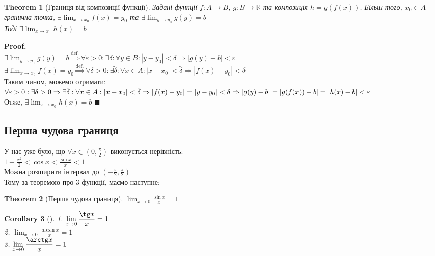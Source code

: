 \documentclass[a4paper, 14pt]{extarticle}
\def\huge{\displaystyle}
\theoremstyle{theoremdd}
\newtheorem{theorem}{Theorem}[subsection]
\theoremstyle{theoremdd}
\theoremstyle{theoremdd}
\theoremstyle{theoremdd}
\theoremstyle{theoremdd}
\theoremstyle{theoremdd}
\theoremstyle{theoremdd}
\theoremstyle{theoremdd}
\newtheorem{corollary}[theorem]{Corollary}
\newenvironment{pf}{\vspace*{-3mm} \textbf{Proof. \\}}{$\blacksquare$}
\begin{document}
\begin{theorem}[Границя від композиції функції]
Задані функції $f: A \to B$, $g: B \to \mathbb{R}$ та композиція $h = g(f(x))$. Більш того, $x_0 \in A$ - гранична точка, $\exists \huge \lim_{x \to x_0} f(x) = y_0$ та $\exists \huge \lim_{y \to y_0} g(y) = b$\\
Тоді $\exists \huge \lim_{x \to x_0} h(x) = b$
\end{theorem}

\begin{pf}
$\exists \huge \lim_{y \to y_0} g(y) = b \overset{\textrm{def.}}{\Rightarrow} \forall \varepsilon > 0: \exists \delta: \forall y \in B: |y-y_0|<\delta \Rightarrow |g(y)-b|<\varepsilon$\\
$\exists \huge \lim_{x \to x_0} f(x) = y_0 \overset{\textrm{def.}}{\Rightarrow} \forall \delta > 0: \exists \tilde{\delta}: \forall x \in A: |x-x_0|<\tilde{\delta} \Rightarrow |f(x)-y_0|<\delta$\\
Таким чином, можемо отримати:\\
$\forall \varepsilon > 0: \exists \delta > 0 \Rightarrow \exists \tilde{\delta}: \forall x \in A: |x-x_0| < \tilde{\delta} \Rightarrow \\ |f(x)-y_0| = |y-y_0|<\delta \Rightarrow |g(y)-b|=|g(f(x))-b| = |h(x)-b|<\varepsilon$\\
Отже, $\exists \huge \lim_{x \to x_0} h(x) = b$
\end{pf}

\subsection{Перша чудова границя}
У нас уже було, що $\forall x \in \huge \left(0, \frac{\pi}{2} \right)$ виконується нерівність:\\
$\huge 1 - \frac{x^2}{2} < \cos x < \frac{\sin x}{x} < 1$\\
Можна розширити інтервал до $\huge \left(-\frac{\pi}{2},\frac{\pi}{2} \right)$\\
Тому за теоремою про 3 функції, маємо наступне:
\begin{theorem}[Перша чудова границя]
$\huge \lim_{x \to 0} \frac{\sin x}{x} = 1$
\end{theorem}

\begin{corollary}[\hspace{0.1cm}]
1. $\huge \lim_{x \to 0} \frac{\tg x}{x} = 1$\\
2. $\huge \lim_{x \to 0} \frac{\arcsin x}{x} = 1$\\
3. $\huge \lim_{x \to 0} \frac{\arctg x}{x} = 1$
\end{corollary}
\end{document}
